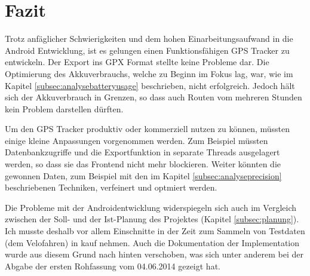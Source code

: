 \clearpage
\section{Fazit}
Trotz anfäglicher Schwierigkeiten und dem hohen Einarbeitungsaufwand in die Android Entwicklung, ist es gelungen einen Funktionsfähigen GPS Tracker zu entwickeln. Der Export ins GPX Format stellte keine Probleme dar. Die Optimierung des Akkuverbrauchs, welche zu Beginn im Fokus lag, war, wie im Kapitel \ref{subsec:analysebatteryusage} beschrieben, nicht erfolgreich. Jedoch hält sich der Akkuverbrauch in Grenzen, so dass auch Routen vom mehreren Stunden kein Problem darstellen dürften.

Um den GPS Tracker produktiv oder kommerziell nutzen zu können, müssten einige kleine Anpassungen vorgenommen werden. Zum Beispiel müssten Datenbankzugriffe und die Exportfunktion in separate Threads ausgelagert werden, so dass sie das Frontend nicht mehr blockieren. Weiter könnten die gewonnen Daten, zum Beispiel mit den im Kapitel \ref{subsec:analyseprecision} beschriebenen Techniken, verfeinert und optmiert werden.

Die Probleme mit der Androidentwicklung widerspiegeln sich auch im Vergleich zwischen der Soll- und der Ist-Planung des Projektes (Kapitel \ref{subsec:planung}). Ich musste deshalb vor allem Einschnitte in der Zeit zum Sammeln von Testdaten (dem Velofahren) in kauf nehmen. Auch die Dokumentation der Implementation wurde aus diesem Grund nach hinten verschoben, was sich unter anderem bei der Abgabe der ersten Rohfassung vom 04.06.2014 gezeigt hat.